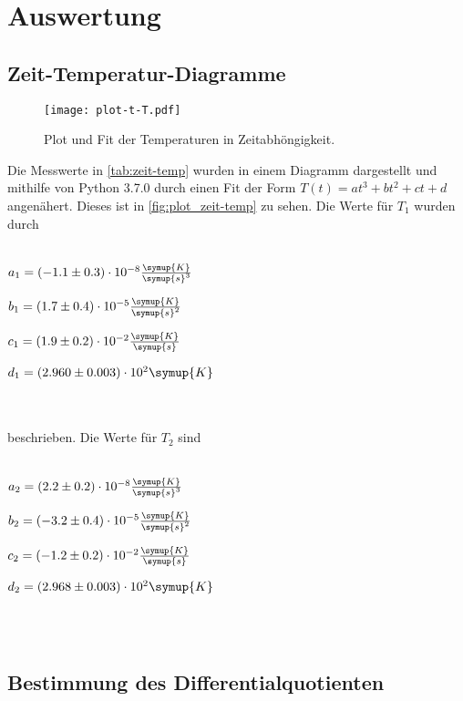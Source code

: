 \section{Auswertung}
\label{sec:Auswertung}
\subsection{Zeit-Temperatur-Diagramme}



\begin{figure}
  \centering
  \texttt{[image: plot-t-T.pdf]}
  \caption{Plot und Fit der Temperaturen in Zeitabhöngigkeit.}
  \label{fig:plot_zeit-temp}
\end{figure}

Die Messwerte in \autoref{tab:zeit-temp} wurden in einem Diagramm dargestellt und mithilfe von Python 3.7.0 durch einen Fit der Form $T(t) = at^3 + bt^2 + ct + d$ angenähert.
Dieses ist in \autoref{fig:plot_zeit-temp} zu sehen. Die Werte für $T_1$ wurden durch
\\ \\
\centerline{$a_1 = (-1.1 \pm 0.3 ) \cdot 10^\text{$-8$} \frac{\symup{K}}{\symup{s}^3}$}
\centerline{$b_1 = ( 1.7 \pm 0.4 ) \cdot 10^\text{$-5$} \frac{\symup{K}}{\symup{s}^2}$}
\centerline{$c_1 = ( 1.9 \pm 0.2 ) \cdot 10^\text{$-2$} \frac{\symup{K}}{\symup{s}}$}
\centerline{$d_1 = ( 2.960 \pm 0.003 ) \cdot 10^\text{$2$} \symup{K}$}
\\ \\
beschrieben. Die Werte für $T_2$ sind
\\ \\
\centerline{$a_2 = ( 2.2 \pm 0.2 ) \cdot 10^\text{$-8$} \frac{\symup{K}}{\symup{s}^3}$}
\centerline{$b_2 = (-3.2 \pm 0.4 ) \cdot 10^\text{$-5$} \frac{\symup{K}}{\symup{s}^2}$}
\centerline{$c_2 = (-1.2 \pm 0.2 ) \cdot 10^\text{$-2$} \frac{\symup{K}}{\symup{s}}$}
\centerline{$d_2 = ( 2.968 \pm 0.003 ) \cdot 10^\text{$2$} \symup{K}$}
\\ \\
\newpage
\subsection{Bestimmung des Differentialquotienten}

